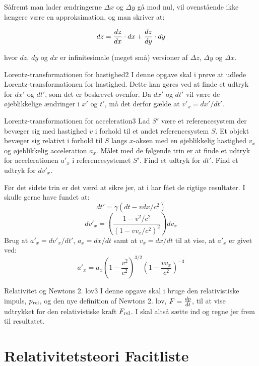 Såfremt man lader ændringerne $\Delta x$ og $\Delta y$ gå mod nul, vil ovenstående ikke længere være en approksimation, og man skriver at:

$$dz = {d{z} \over d{x}} \cdot dx + {d{z} \over d{y}} \cdot dy$$


hvor $dz$, $dy$ og $dx$ er infinitesimale (meget små) versioner af $\Delta z$, $\Delta y$ og $\Delta x$.\\

\begin{opgave}{Lorentz-transformationen for hastighed}{2}
	I denne opgave skal i prøve at udlede Lorentz-transformationen for hastighed. Dette kan gøres ved at finde et udtryk for $dx'$ og $dt'$, som det er beskrevet ovenfor. Da $dx'$ og $dt'$ vil være de øjeblikkelige ændringer i $x'$ og $t'$, må det derfor gælde at $v'_x = dx'/dt'$.
\end{opgave}

\begin{opgave}{Lorentz-transformationen for acceleration}{3}
	Lad $S'$ være et referencesystem der bevæger sig med hastighed $v$ i forhold til et andet referencesystem $S$. Et objekt bevæger sig relativt i forhold til $S$ langs $x$-aksen med en øjeblikkelig hastighed $v_x$ og øjeblikkelig acceleration $a_x$. Målet med de følgende trin er at finde et udtryk for accelerationen $a'_x$ i referencesystemet $S'$.
	\opg Find et udtryk for $dt'$.
	\opg Find et udtryk for $dv'_x$.
	
	
	Før det sidste trin er det værd at sikre jer, at i har fået de rigtige resultater. I skulle gerne have fundet at:
	$$dt' = \gamma \left( dt - v dx / c^2 \right)$$
	$$dv'_x = \left( \frac{1 - v^2/c^2}{ \left( 1-vv_x/c^2 \right)^2 } \right) dv_x$$
	\opg Brug at $a'_x = dv'_x / dt'$, $a_x = dx/dt$ samt at $v_x = dx/dt$ til at vise, at $a'_x$ er givet ved:
	$$a'_x = a_x \left( 1- \frac{v^2}{c^2} \right)^{3/2} \left( 1 - \frac{vv_x}{c^2}  \right)^{-3}$$
\end{opgave}

\begin{opgave}{Relativitet og Newtons 2. lov}{3}
	I denne opgave skal i bruge den relativistiske impuls, $p_{\text{rel}}$, og den nye definition af Newtons 2. lov, $F = {d{p} \over d{t}}$, til at vise udtrykket for den relativistiske kraft $F_{\text{rel}}$. I skal altså sætte ind og regne jer frem til resultatet.
\end{opgave}

\chapter{Relativitetsteori Facitliste}

